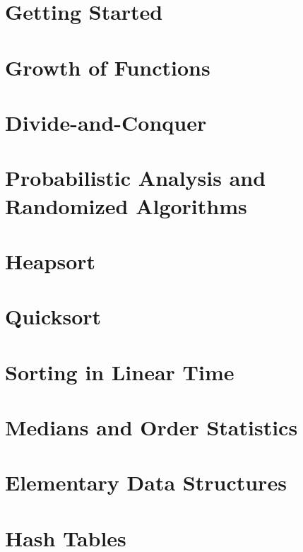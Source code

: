 \documentclass{book}
\begin{document}

\chapter{Getting Started}

\chapter{Growth of Functions}

\chapter{Divide-and-Conquer}

\chapter{Probabilistic Analysis and Randomized Algorithms}

\chapter{Heapsort}

\chapter{Quicksort}

\chapter{Sorting in Linear Time}

\chapter{Medians and Order Statistics}

\chapter{Elementary Data Structures}

\chapter{Hash Tables}
\end{document}
